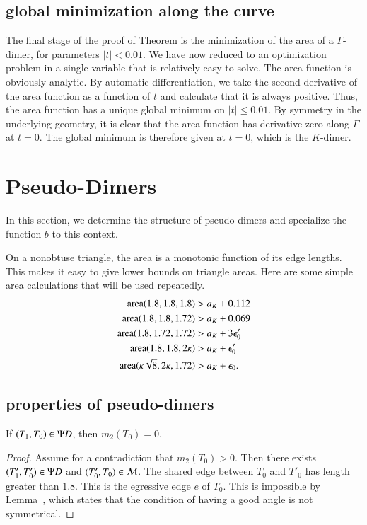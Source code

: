 \subsection{global minimization along the curve}

The final stage of the proof of Theorem  is the minimization of the area of a $\Gamma$-dimer,
for parameters $|t|<0.01$.    We have now reduced to an optimization problem in a single variable 
that is relatively easy to solve.  The area function is obviously analytic.
By automatic differentiation, we take the second derivative of the area
function as a function of $t$ and calculate that it is always positive.  Thus, the area function has a unique
global minimum on $|t|\le 0.01$.  
By symmetry in the underlying geometry, 
it is clear that the area function has derivative zero along $\Gamma$ at
$t=0$.  The global minimum is therefore given at $t=0$, which is the $K$-dimer.

\section{Pseudo-Dimers}

In this section, we determine the structure of pseudo-dimers and specialize
the function $b$ to this context.

On a nonobtuse triangle, the area is a monotonic function of its edge lengths.
This makes it easy to give lower bounds on triangle areas.
Here are some simple    area calculations that will be used repeatedly.
\begin{align*}
{\operatorname{area}}(1.8,1.8,1.8) &> a_K + 0.112\\
{\operatorname{area}}(1.8,1.8,1.72) &> a_K + 0.069\\
{\operatorname{area}}(1.8,1.72,1.72) &> a_K + 3\epsilon_0'\\
{\operatorname{area}}(1.8,1.8,2\kappa) &> a_K + \epsilon_0'\\
{\operatorname{area}}(\kappa\sqrt8,2\kappa,1.72) &> a_K +\epsilon_0.
\end{align*}


\subsection{properties of pseudo-dimers}

\begin{lemma}  If $(T_1,T_0)\in\Psi D$, then $m_2(T_0)=0$.
\end{lemma}

\begin{proof} Assume for a contradiction that $m_2(T_0)>0$.  Then there exists $(T'_1,T_0')\in\Psi D$ and
$(T'_0,T_0)\in\mathcal M$.  The shared edge between $T_0$ and $T'_0$ has length greater than $1.8$.
This is the egressive edge $e$ of $T_0$.  This is impossible by Lemma~, which states
that the condition of having a good angle is not symmetrical.
\end{proof}

